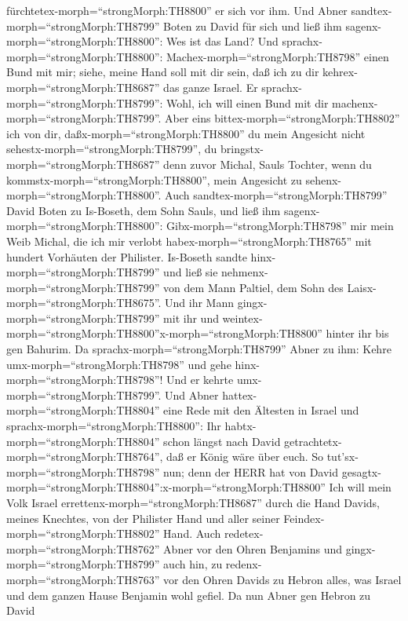 fürchtetex-morph=``strongMorph:TH8800'' er sich vor ihm. 
Und Abner sandtex-morph=``strongMorph:TH8799'' Boten zu David für sich
und ließ ihm sagenx-morph=``strongMorph:TH8800'': Wes ist das Land? Und
sprachx-morph=``strongMorph:TH8800'':
Machex-morph=``strongMorph:TH8798'' einen Bund mit mir; siehe, meine
Hand soll mit dir sein, daß ich zu dir
kehrex-morph=``strongMorph:TH8687'' das ganze Israel.  Er
sprachx-morph=``strongMorph:TH8799'': Wohl, ich will einen Bund mit dir
machenx-morph=``strongMorph:TH8799''. Aber eins
bittex-morph=``strongMorph:TH8802'' ich von dir,
daßx-morph=``strongMorph:TH8800'' du mein Angesicht nicht
sehestx-morph=``strongMorph:TH8799'', du
bringstx-morph=``strongMorph:TH8687'' denn zuvor Michal, Sauls Tochter,
wenn du kommstx-morph=``strongMorph:TH8800'', mein Angesicht zu
sehenx-morph=``strongMorph:TH8800''.  Auch
sandtex-morph=``strongMorph:TH8799'' David Boten zu Is-Boseth, dem Sohn
Sauls, und ließ ihm sagenx-morph=``strongMorph:TH8800'':
Gibx-morph=``strongMorph:TH8798'' mir mein Weib Michal, die ich mir
verlobt habex-morph=``strongMorph:TH8765'' mit hundert Vorhäuten der
Philister.  Is-Boseth sandte
hinx-morph=``strongMorph:TH8799'' und ließ sie
nehmenx-morph=``strongMorph:TH8799'' von dem Mann Paltiel, dem Sohn des
Laisx-morph=``strongMorph:TH8675''.  Und ihr Mann
gingx-morph=``strongMorph:TH8799'' mit ihr und
weintex-morph=``strongMorph:TH8800''x-morph=``strongMorph:TH8800''
hinter ihr bis gen Bahurim. Da sprachx-morph=``strongMorph:TH8799''
Abner zu ihm: Kehre umx-morph=``strongMorph:TH8798'' und gehe
hinx-morph=``strongMorph:TH8798''! Und er kehrte
umx-morph=``strongMorph:TH8799''.  Und Abner
hattex-morph=``strongMorph:TH8804'' eine Rede mit den Ältesten in Israel
und sprachx-morph=``strongMorph:TH8800'': Ihr
habtx-morph=``strongMorph:TH8804'' schon längst nach David
getrachtetx-morph=``strongMorph:TH8764'', daß er König wäre über euch.
 So tut'sx-morph=``strongMorph:TH8798'' nun; denn der HERR
hat von David
gesagtx-morph=``strongMorph:TH8804'':x-morph=``strongMorph:TH8800'' Ich
will mein Volk Israel errettenx-morph=``strongMorph:TH8687'' durch die
Hand Davids, meines Knechtes, von der Philister Hand und aller seiner
Feindex-morph=``strongMorph:TH8802'' Hand.  Auch
redetex-morph=``strongMorph:TH8762'' Abner vor den Ohren Benjamins und
gingx-morph=``strongMorph:TH8799'' auch hin, zu
redenx-morph=``strongMorph:TH8763'' vor den Ohren Davids zu Hebron
alles, was Israel und dem ganzen Hause Benjamin wohl gefiel.
 Da nun Abner gen Hebron zu David
